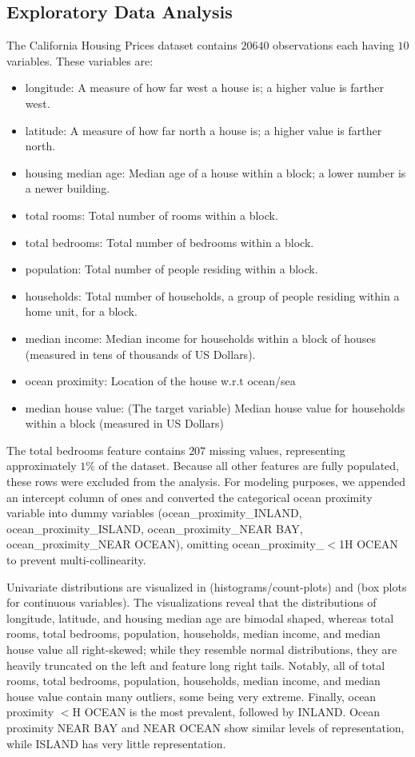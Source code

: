 \documentclass{article}
\begin{document}
\subsection{Exploratory Data Analysis}

The California Housing Prices dataset contains $20640$ observations each having $10$ variables. These variables are:
\begin{itemize}
	\item longitude: A measure of how far west a house is; a higher value is farther west.
	\item latitude: A measure of how far north a house is; a higher value is farther north.
	\item housing median age: Median age of a house within a block; a lower number is a newer building.
	\item total rooms: Total number of rooms within a block.
	\item total bedrooms: Total number of bedrooms within a block.
	\item population: Total number of people residing within a block.
	\item households: Total number of households, a group of people residing within a home unit, for a block.
	\item median income: Median income for households within a block of houses (measured in tens of thousands of US Dollars).
	\item ocean proximity: Location of the house w.r.t ocean/sea
	\item median house value: (The target variable) Median house value for households within a block (measured in US Dollars)
\end{itemize}

The total bedrooms feature contains $207$ missing values, representing approximately $1\%$ of the dataset. Because all other features are fully populated, these rows were excluded from the analysis. For modeling purposes, we appended an intercept column of ones and converted the categorical ocean proximity variable into dummy variables (ocean\_proximity\_INLAND, ocean\_proximity\_ISLAND, ocean\_proximity\_NEAR BAY, ocean\_proximity\_NEAR OCEAN), omitting ocean\_proximity\_$<$1H OCEAN to prevent multi-collinearity.

Univariate distributions are visualized in  (histograms/count-plots) and  (box plots for continuous variables). The visualizations reveal that the distributions of longitude, latitude, and housing median age are bimodal shaped, whereas total rooms, total bedrooms, population, households, median income, and median house value all right-skewed; while they resemble normal distributions, they are heavily truncated on the left and feature long right tails. Notably, all of total rooms, total bedrooms, population, households, median income, and median house value contain many outliers, some being very extreme. Finally, ocean proximity $<$H OCEAN is the most prevalent, followed by INLAND. Ocean proximity NEAR BAY and NEAR OCEAN show similar levels of representation, while ISLAND has very little representation.
\end{document}
